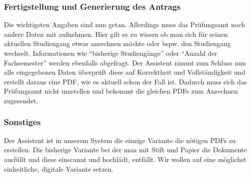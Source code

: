 \subsubsection{Fertigstellung und Generierung des Antrags}
Die wichtigsten Angaben sind nun getan. Allerdings muss das Prüfungsamt noch andere Daten mit aufnehmen. Hier gilt es zu wissen ob man sich für seinen aktuellen Studiengang etwas anrechnen möchte oder bspw. den Studiengang wechselt. Informationen wie “bisherige Studiengänge” oder “Anzahl der Fachsemester” werden ebenfalls abgefragt.
Der Assistent nimmt zum Schluss nun alle eingegebenen Daten überprüft diese auf Korrektheit und Vollständigkeit und erstellt daraus eine PDF, wie es aktuell schon der Fall ist. Dadurch muss sich das Prüfungsamt nicht umstellen und bekommt die gleichen PDFs zum Anrechnen zugesendet.

\subsubsection{Sonstiges}
Der Assistent ist in unserem System die einzige Variante die nötigen PDFs zu erstellen. Die bisherige Variante bei der man mit Stift und Papier die Dokumente ausfüllt und diese einscannt und hochlädt, entfällt. Wir wollen auf eine möglichst einheitliche, digitale Variante setzen.
